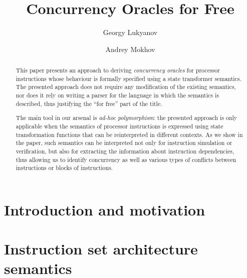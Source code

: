 \documentclass{llncs}
\begin{document}
%
\title{Concurrency Oracles for Free}

%
\author{Georgy Lukyanov \and Andrey Mokhov}
%
%

\maketitle

\begin{abstract}
This paper presents an approach to deriving \emph{concurrency oracles} for
processor instructions whose behaviour is formally specified using a state
transformer semantics. The presented approach does not require any modification
of the existing semantics, nor does it rely on writing a parser for the language
in which the semantics is described, thus justifying the ``for free'' part of
the title.

The main tool in our arsenal is \emph{ad-hoc polymorphism}: the presented
approach is only applicable when the semantics of processor instructions is
expressed using state transformation functions that can be reinterpreted in
different contexts. As we show in the paper, such semantics can be interpreted
not only for instruction simulation or verification, but also for extracting the
information about instruction dependencies, thus allowing us to identify
concurrency as well as various types of conflicts between instructions or blocks
of instructions.

\end{abstract}

\section{Introduction and motivation\label{sec:intro}}


\vspace{-1mm}
\section{Instruction set architecture semantics\label{sec:instructions}}
\vspace{-1mm}

\end{document}
